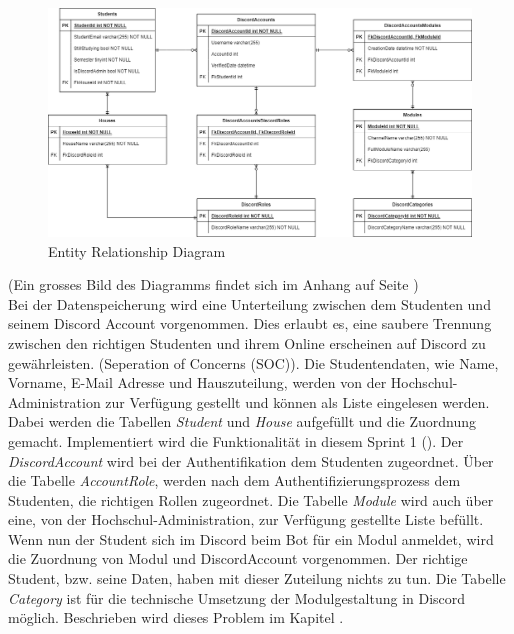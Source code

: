 \documentclass[a4paper, table]{article}
\begin{document}
\begin{figure}[h]
    \centering
    \includegraphics[width=1\textwidth]{img/ER-Diagramm.png}
    \caption{Entity Relationship Diagram}
    \label{fig:ER-Diagram}
\end{figure}

(Ein grosses Bild des Diagramms findet sich im Anhang auf Seite \pageref*{fig:ER-Diagram-big})\\
Bei der Datenspeicherung wird eine Unterteilung zwischen dem Studenten und seinem Discord Account vorgenommen.
Dies erlaubt es, eine saubere Trennung zwischen den richtigen Studenten und ihrem Online erscheinen auf Discord zu gewährleisten.
(Seperation of Concerns (SOC)).
Die Studentendaten, wie Name, Vorname, E-Mail Adresse und Hauszuteilung, werden von der Hochschul-Administration zur Verfügung gestellt und können als Liste eingelesen werden.
Dabei werden die Tabellen \textit{Student} und \textit{House} aufgefüllt und die Zuordnung gemacht.
Implementiert wird die Funktionalität in diesem Sprint 1 ().
\newline
Der \textit{DiscordAccount} wird bei der Authentifikation dem Studenten zugeordnet.
Über die Tabelle \textit{AccountRole}, werden nach dem Authentifizierungsprozess dem Studenten, die richtigen Rollen zugeordnet.
\newline
Die Tabelle \textit{Module} wird auch über eine, von der Hochschul-Administration, zur Verfügung gestellte Liste befüllt.
Wenn nun der Student sich im Discord beim Bot für ein Modul anmeldet, wird die Zuordnung von Modul und DiscordAccount vorgenommen.
Der richtige Student, bzw. seine Daten, haben mit dieser Zuteilung nichts zu tun.
\newline
Die Tabelle \textit{Category} ist für die technische Umsetzung der Modulgestaltung in Discord möglich.
Beschrieben wird dieses Problem im Kapitel .
\end{document}
